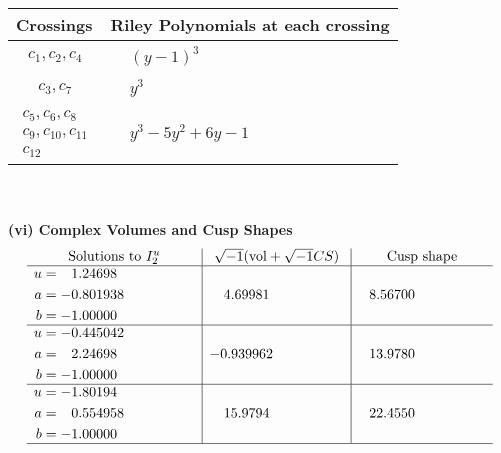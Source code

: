 \documentclass[1p]{elsarticle_modified}
\theoremstyle{definition}
\newcommand{\I}{\sqrt{-1}}
\begin{document}
\begin{tabular}{m{50pt}|m{274pt}}
Crossings & \hspace{64pt}Riley Polynomials at each crossing \\
\hline $$\begin{aligned}c_{1},c_{2},c_{4}\end{aligned}$$&$\begin{aligned}
&(y-1)^3
\end{aligned}$\\
\hline $$\begin{aligned}c_{3},c_{7}\end{aligned}$$&$\begin{aligned}
&y^3
\end{aligned}$\\
\hline $$\begin{aligned}c_{5},c_{6},c_{8}\\c_{9},c_{10},c_{11}\\c_{12}\end{aligned}$$&$\begin{aligned}
&y^3-5 y^2+6 y-1
\end{aligned}$\\
\hline
\end{tabular}\\~\\
\newpage\flushleft \textbf{(vi) Complex Volumes and Cusp Shapes}
$$\begin{array}{c|c|c}  
\text{Solutions to }I^u_{2}& \I (\text{vol} + \sqrt{-1}CS) & \text{Cusp shape}\\
 \hline 
\begin{aligned}
u &= \phantom{-}1.24698\phantom{ +0.000000I} \\
a &= -0.801938\phantom{ +0.000000I} \\
b &= -1.00000\phantom{ +0.000000I}\end{aligned}
 & \phantom{-}4.69981\phantom{ +0.000000I} & \phantom{-}8.56700\phantom{ +0.000000I} \\ \hline\begin{aligned}
u &= -0.445042\phantom{ +0.000000I} \\
a &= \phantom{-}2.24698\phantom{ +0.000000I} \\
b &= -1.00000\phantom{ +0.000000I}\end{aligned}
 & -0.939962\phantom{ +0.000000I} & \phantom{-}13.9780\phantom{ +0.000000I} \\ \hline\begin{aligned}
u &= -1.80194\phantom{ +0.000000I} \\
a &= \phantom{-}0.554958\phantom{ +0.000000I} \\
b &= -1.00000\phantom{ +0.000000I}\end{aligned}
 & \phantom{-}15.9794\phantom{ +0.000000I} & \phantom{-}22.4550\phantom{ +0.000000I}\\
 \hline 
 \end{array}$$\newpage\newpage\renewcommand{\arraystretch}{1}
\end{document}

